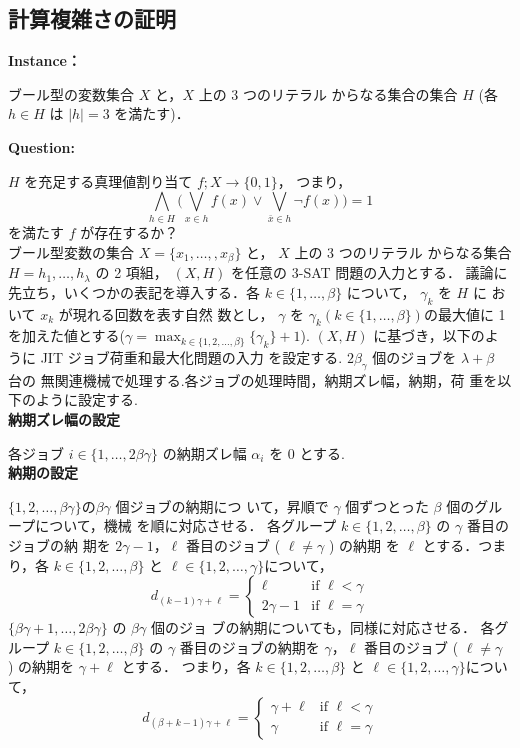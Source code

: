 \documentclass[12pt]{optlab-bachelor}
\begin{document}
\subsection{計算複雑さの証明}
\noindent \textbf{Instance：}

ブール型の変数集合 $X$ と，$X$ 上の 3 つのリテラル
からなる集合の集合 $H$ (各 $h \in H$ は $|h| = 3$ を満たす)．

\noindent \textbf{Question:}

$H$ を充足する真理値割り当て $f ; X \to \{0,1\}$，
つまり，
$$\displaystyle \bigwedge_{h \in H} \bigg(\bigvee_{x \in h}f(x) \lor
\bigvee_{\bar x \in h}\lnot f(x) \bigg) = 1$$
を満たす $f$ が存在するか？\\

ブール型変数の集合 $X = \{x_1,\ldots,,x_β\}$ と， $X$ 上の 3 つのリテラル
からなる集合 $H = {h_1,\ldots,h_{\lambda}}$ の 2 項組， $(X,H)$ を任意の
3-SAT 問題の入力とする．
議論に先立ち，いくつかの表記を導入する．各 $k \in \{1,\ldots,\beta\}$
について， $\gamma_k$ を $H$ に おいて $x_k$ が現れる回数を表す自然
数とし， $\gamma$ を $\gamma_k ( k \in \{1,\ldots,\beta\} )$の最大値に
1 を加えた値とする($\displaystyle \gamma = \max_{k \in \{1,2,\ldots, \beta\}} \{\gamma_k \}+ 1$).
$(X, H)$ に基づき，以下のように JIT ジョブ荷重和最大化問題の入力
を設定する. $2\beta_{\gamma}$ 個のジョブを $\lambda + \beta$ 台の
無関連機械で処理する.各ジョブの処理時間，納期ズレ幅，納期，荷
重を以下のように設定する.\\

\noindent \textbf{納期ズレ幅の設定}

各ジョブ $i \in \{1,\ldots,2\beta \gamma\}$ の納期ズレ幅
$\alpha_i$ を 0 とする.\\

\noindent \textbf{納期の設定}

$\{1,2,\ldots, \beta \gamma\}$$ の $$\beta \gamma$ 個ジョブの納期につ
いて，昇順で $\gamma$ 個ずつとった $\beta$ 個のグループについて，機械
を順に対応させる．
各グループ $k \in \{1,2,\ldots, \beta\}$ の $\gamma$ 番目のジョブの納
期を $2\gamma - 1$，$\ell$ 番目のジョブ ( $\ell \neq \gamma$ ) の納期
を $\ell$ とする．つまり，各 $k \in \{1,2,\ldots, \beta\}$ と $\ell \in \{1,2,\ldots,
\gamma\}$について，
$$d_{(k - 1)\gamma + \ell} = \left\{ \begin{array}{ll} \ell & \text{if } \ell < \gamma \\ 2\gamma - 1 & \text{if } \ell = \gamma \end{array} \right.$$
$\{\beta \gamma + 1,\ldots, 2\beta \gamma\}$ の $\beta \gamma$ 個のジョ
ブの納期についても，同様に対応させる．
各グループ $k \in \{1,2,\ldots, \beta\}$ の $\gamma$ 番目のジョブの納期を $\gamma$，$\ell$ 番目のジョブ ( $\ell \neq \gamma$ ) の納期を $\gamma + \ell$ とする．
つまり，各 $k \in \{1,2,\ldots, \beta\}$ と $\ell \in \{1,2,\ldots,
\gamma\}$について，
$$d_{(\beta + k - 1)\gamma + \ell} = \left\{ \begin{array}{ll}\gamma +  \ell & \text{if } \ell < \gamma \\ \gamma & \text{if } \ell = \gamma \end{array} \right.$$
\end{document}
